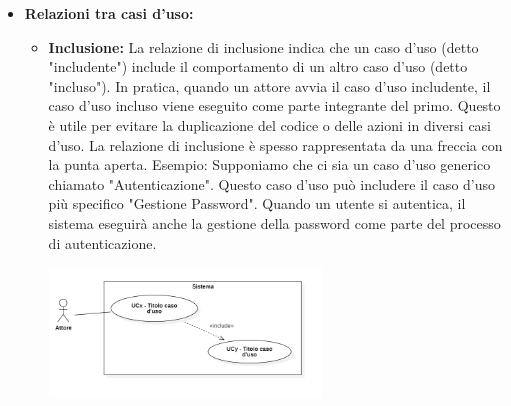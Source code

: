 \documentclass{article}
\begin{document}
\begin{itemize}
    \item \textbf{Relazioni tra casi d'uso:}
    \begin{itemize}
        \item \textbf{Inclusione:}
        La relazione di inclusione indica che un caso d'uso (detto "includente") include il comportamento di un altro caso d'uso (detto "incluso"). In pratica, quando un attore avvia il caso d'uso includente, il caso d'uso incluso viene eseguito come parte integrante del primo. Questo è utile per evitare la duplicazione del codice o delle azioni in diversi casi d'uso. La relazione di inclusione è spesso rappresentata da una freccia con la punta aperta.
        Esempio: Supponiamo che ci sia un caso d'uso generico chiamato "Autenticazione". Questo caso d'uso può includere il caso d'uso più specifico "Gestione Password". Quando un utente si autentica, il sistema eseguirà anche la gestione della password come parte del processo di autenticazione.
        \begin{minipage}[t]{\linewidth}
            \centering
            \includegraphics[width=0.6\textwidth]{../Images/NormeDiProgetto/Inclusione.PNG}
        \end{minipage}


\end{itemize}
\end{itemize}
\end{document}
